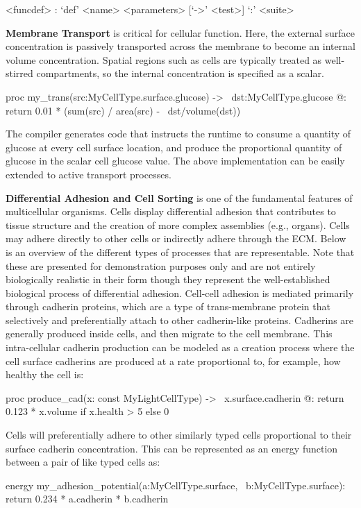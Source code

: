 \documentclass[12pt]{article}
\begin{document}
\begin{grammar}
	<funcdef> : `def' <name> <parameters> [`->' <test>] `:' <suite>
	




\end{grammar}


\textbf{Membrane Transport} is critical for cellular function. Here, the external surface concentration is passively transported across the membrane to become an internal volume concentration. Spatial regions such as cells are typically treated as well-stirred compartments, so the internal concentration is specified as a scalar.  
%
\begin{python}
proc my_trans(src:MyCellType.surface.glucose) -> \
    dst:MyCellType.glucose @:
    return 0.01 * (sum(src) / area(src) - \
	    dst/volume(dst))
\end{python}
The compiler generates code that instructs the runtime to consume a quantity of glucose at every cell surface location, and produce the proportional quantity of glucose in the scalar cell glucose value. The above implementation can be easily extended to active transport processes. 


\textbf{Differential Adhesion and Cell Sorting} is one of the fundamental features of multicellular organisms. Cells display differential adhesion that contributes to tissue structure and the creation of more complex assemblies (e.g., organs). Cells may adhere directly to other cells or indirectly adhere through the ECM. Below is an overview of the different types of processes that are representable. Note that these are presented for demonstration purposes only and are not entirely biologically realistic in their form though they represent the well-established biological process of differential adhesion. Cell-cell adhesion is mediated primarily through cadherin proteins, which are a type of trans-membrane protein that selectively and preferentially attach to other cadherin-like proteins. Cadherins are generally produced inside cells, and then migrate to the cell membrane. This intra-cellular cadherin production can be modeled as a creation process where the cell surface cadherins are produced at a rate proportional to, for example, how healthy the cell is:
%
\begin{python}
proc produce_cad(x: const MyLightCellType) -> \
    x.surface.cadherin @:
    return 0.123 * x.volume if x.health > 5 else 0
\end{python}
%
Cells will preferentially adhere to other similarly typed cells proportional to their surface cadherin concentration. This can be represented as an energy function between a pair of like typed cells as:
\begin{python}
energy my_adhesion_potential(a:MyCellType.surface, \
    b:MyCellType.surface):
    return 0.234 * a.cadherin * b.cadherin
\end{python}
%
\end{document}
